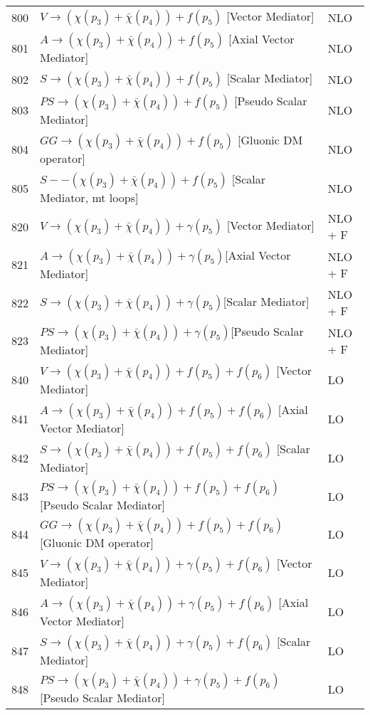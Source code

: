 \begin{table}
\begin{center}
\begin{tabular}{|l|l|l|}
\hline
800 & $ V\to({\chi}(p_3)+\bar{\chi}(p_4)) +f(p_5) $ [Vector Mediator] & NLO \\
801 & $ A\to({\chi}(p_3)+\bar{\chi}(p_4)) +f(p_5)$ [Axial Vector Mediator] & NLO \\
802 & $ S\to({\chi}(p_3)+\bar{\chi}(p_4)) +f(p_5)$ [Scalar Mediator] & NLO \\
803 &  $ PS\to({\chi}(p_3)+\bar{\chi}(p_4)) +f(p_5)$ [Pseudo Scalar Mediator] & NLO \\
804 &  $ GG\to({\chi}(p_3)+\bar{\chi}(p_4)) +f(p_5)$ [Gluonic DM operator]  & NLO \\
805 & $ S--({\chi}(p_3)+\bar{\chi}(p_4)) +f(p_5)$ [Scalar Mediator, mt loops] & NLO \\
\hline
820 & $V\to({\chi}(p_3)+\bar{\chi}(p_4)) +\gamma(p_5)$ [Vector Mediator] & NLO + F \\
821 & $A\to({\chi}(p_3)+\bar{\chi}(p_4)) +\gamma(p_5) $[Axial Vector Mediator] & NLO + F \\
822 & $ S\to({\chi}(p_3)+\bar{\chi}(p_4)) +\gamma(p_5) $[Scalar Mediator] & NLO + F \\
823 &$ PS\to({\chi}(p_3)+\bar{\chi}(p_4)) +\gamma(p_5) $[Pseudo Scalar Mediator] & NLO + F \\
\hline
840 &$ V\to({\chi}(p_3)+\bar{\chi}(p_4)) +f(p_5)+f(p_6)$ [Vector Mediator] & LO\\
841 &$A\to({\chi}(p_3)+\bar{\chi}(p_4)) +f(p_5)+f(p_6)$ [Axial Vector Mediator]  & LO\\
842 &$ S\to({\chi}(p_3)+\bar{\chi}(p_4)) +f(p_5)+f(p_6)$ [Scalar Mediator]  & LO\\
843 &$ PS\to({\chi}(p_3)+\bar{\chi}(p_4)) +f(p_5)+f(p_6)$ [Pseudo Scalar Mediator]  & LO\\
844 &$ GG\to({\chi}(p_3)+\bar{\chi}(p_4)) +f(p_5)+f(p_6)$ [Gluonic DM operator]  & LO\\
\hline
845 & $V\to({\chi}(p_3)+\bar{\chi}(p_4)) +\gamma(p_5)+f(p_6)$ [Vector Mediator]  & LO\\
846 & $A\to({\chi}(p_3)+\bar{\chi}(p_4)) +\gamma(p_5)+f(p_6)$ [Axial Vector Mediator]  & LO\\
847 & $S\to({\chi}(p_3)+\bar{\chi}(p_4)) +\gamma(p_5)+f(p_6)$ [Scalar Mediator]  & LO\\
848 & $PS\to({\chi}(p_3)+\bar{\chi}(p_4)) +\gamma(p_5)+f(p_6)$ [Pseudo Scalar Mediator]  & LO\\

\end{tabular}
\end{center}
\end{table}
